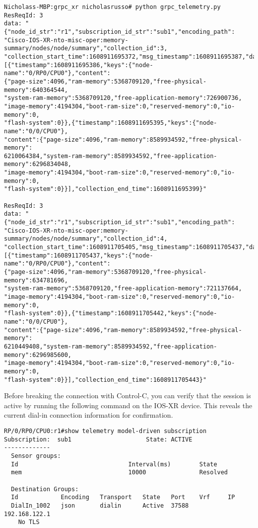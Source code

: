 \begin{verbatim}
Nicholass-MBP:grpc_xr nicholasrusso# python grpc_telemetry.py
ResReqId: 3
data: "{"node_id_str":"r1","subscription_id_str":"sub1","encoding_path":
"Cisco-IOS-XR-nto-misc-oper:memory-summary/nodes/node/summary","collection_id":3,
"collection_start_time":1608911695372,"msg_timestamp":1608911695387,"data_json":
[{"timestamp":1608911695386,"keys":{"node-name":"0/RP0/CPU0"},"content":
{"page-size":4096,"ram-memory":5368709120,"free-physical-memory":640364544,
"system-ram-memory":5368709120,"free-application-memory":726900736,
"image-memory":4194304,"boot-ram-size":0,"reserved-memory":0,"io-memory":0,
"flash-system":0}},{"timestamp":1608911695395,"keys":{"node-name":"0/0/CPU0"},
"content":{"page-size":4096,"ram-memory":8589934592,"free-physical-memory":
6210064384,"system-ram-memory":8589934592,"free-application-memory":6296834048,
"image-memory":4194304,"boot-ram-size":0,"reserved-memory":0,"io-memory":0,
"flash-system":0}}],"collection_end_time":1608911695399}"

ResReqId: 3
data: "{"node_id_str":"r1","subscription_id_str":"sub1","encoding_path":
"Cisco-IOS-XR-nto-misc-oper:memory-summary/nodes/node/summary","collection_id":4,
"collection_start_time":1608911705405,"msg_timestamp":1608911705437,"data_json":
[{"timestamp":1608911705437,"keys":{"node-name":"0/RP0/CPU0"},"content":
{"page-size":4096,"ram-memory":5368709120,"free-physical-memory":634781696,
"system-ram-memory":5368709120,"free-application-memory":721137664,
"image-memory":4194304,"boot-ram-size":0,"reserved-memory":0,"io-memory":0,
"flash-system":0}},{"timestamp":1608911705442,"keys":{"node-name":"0/0/CPU0"},
"content":{"page-size":4096,"ram-memory":8589934592,"free-physical-memory":
6210449408,"system-ram-memory":8589934592,"free-application-memory":6296985600,
"image-memory":4194304,"boot-ram-size":0,"reserved-memory":0,"io-memory":0,
"flash-system":0}}],"collection_end_time":1608911705443}"
\end{verbatim}

Before breaking the connection with Control-C, you can verify that the
session is active by running the following command on the IOS-XR device.
This reveals the current dial-in connection information for confirmation.

\begin{verbatim}
RP/0/RP0/CPU0:r1#show telemetry model-driven subscription
Subscription:  sub1                     State: ACTIVE
-------------
  Sensor groups:
  Id                               Interval(ms)        State
  mem                              10000               Resolved

  Destination Groups:
  Id            Encoding   Transport   State   Port    Vrf     IP
  DialIn_1002   json       dialin      Active  37588           192.168.122.1
    No TLS
\end{verbatim}

